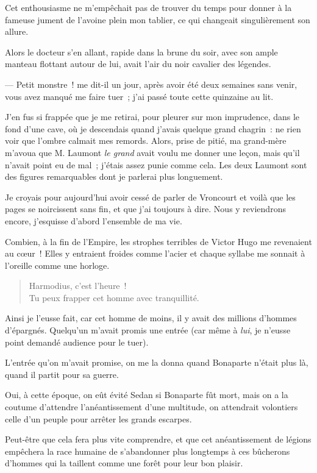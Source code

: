 \documentclass[french,twoside]{book} %
\newcommand\chapterclose{} %
\begin{document}
Cet enthousiasme ne m’empêchait pas de trouver du temps pour donner à la fameuse jument de l’avoine plein mon tablier, ce qui changeait singulièrement son allure.\par
Alors le docteur s’en allant, rapide dans la brune du soir, avec son ample manteau flottant autour de lui, avait l’air du noir cavalier des légendes.\par
— Petit monstre ! me dit-il un jour, après avoir  été deux semaines sans venir, vous avez manqué me faire tuer ; j’ai passé toute cette quinzaine au lit.\par
J’en fus si frappée que je me retirai, pour pleurer sur mon imprudence, dans le fond d’une cave, où je descendais quand j’avais quelque grand chagrin : ne rien voir que l’ombre calmait mes remords. Alors, prise de pitié, ma grand-mère m’avoua que M. Laumont \emph{le grand} avait voulu me donner une leçon, mais qu’il n’avait point eu de mal ; j’étais assez punie comme cela. Les deux Laumont sont des figures remarquables dont je parlerai plus longuement.\par
Je croyais pour aujourd’hui avoir cessé de parler de Vroncourt et voilà que les pages se noircissent sans fin, et que j’ai toujours à dire. Nous y reviendrons encore, j’esquisse d’abord l’ensemble de ma vie.\par
Combien, à la fin de l’Empire, les strophes terribles de Victor Hugo me revenaient au cœur ! Elles y entraient froides comme l’acier et chaque syllabe me sonnait à l’oreille comme une horloge.\par


\begin{verse}
\hspace{1em}\hspace{1em}\hspace{1em}Harmodius, c’est l’heure !\\
Tu peux frapper cet homme avec tranquillité.\\
\end{verse}

\noindent Ainsi je l’eusse fait, car cet homme de moins, il y avait des millions d’hommes d’épargnés.  Quelqu’un m’avait promis une entrée (car même à \emph{lui}, je n’eusse point demandé audience pour le tuer).\par
L’entrée qu’on m’avait promise, on me la donna quand Bonaparte n’était plus là, quand il partit pour sa guerre.\par
Oui, à cette époque, on eût évité Sedan si Bonaparte fût mort, mais on a la coutume d’attendre l’anéantissement d’une multitude, on attendrait volontiers celle d’un peuple pour arrêter les grands escarpes.\par
Peut-être que cela fera plus vite comprendre, et que cet anéantissement de légions empêchera la race humaine de s’abandonner plus longtemps à ces bûcherons d’hommes qui la taillent comme une forêt pour leur bon plaisir.
\chapterclose
\end{document}
